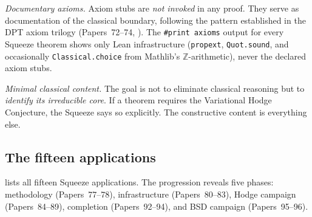 \documentclass[11pt]{article}
\theoremstyle{plain}
\theoremstyle{definition}
\theoremstyle{remark}
\newcommand{\ZZ}{\mathbb{Z}}
\begin{document}
\emph{Documentary axioms.}  Axiom stubs are \emph{not invoked} in
any proof.  They serve as documentation of the classical boundary,
following the pattern established in the DPT axiom trilogy
(Papers~72--74, \cite{p72,p73,p74}).  The \texttt{\#print axioms}
output for every Squeeze theorem shows only Lean infrastructure
(\texttt{propext}, \texttt{Quot.sound}, and occasionally
\texttt{Classical.choice} from Mathlib's $\ZZ$-arithmetic), never
the declared axiom stubs.

\emph{Minimal classical content.}  The goal is not to eliminate
classical reasoning but to \emph{identify its irreducible core}.
If a theorem requires the Variational Hodge Conjecture, the Squeeze
says so explicitly.  The constructive content is everything else.


\subsection{The fifteen applications}

 lists all fifteen Squeeze
applications.  The progression reveals five phases: methodology
(Papers~77--78), infrastructure (Papers~80--83), Hodge campaign
(Papers~84--89), completion (Papers~92--94), and BSD campaign
(Papers~95--96).
\end{document}
